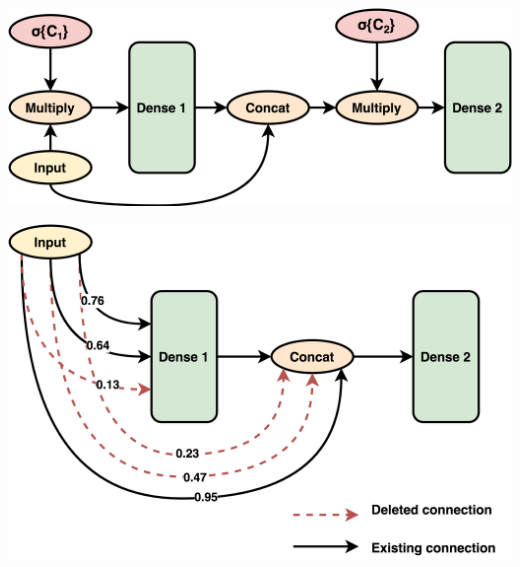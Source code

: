\documentclass{article}
\begin{document}
\noindent\begin{minipage}{.5\textwidth}
   \centering
   \includegraphics[scale=0.1]{paper/Pruning1.png}
\end{minipage}
\begin{minipage}{.4\textwidth}
\centering
   \includegraphics[scale=0.09]{paper/Pruning2.png}
\end{minipage}
\end{document}
